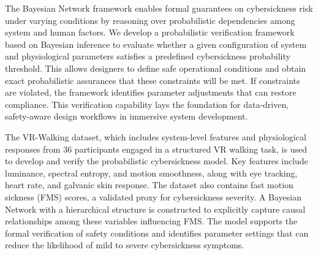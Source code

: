 \documentclass{vgtc}                          %
\begin{document}
The Bayesian Network framework enables formal guarantees on cybersickness risk under varying conditions by reasoning over probabilistic dependencies among system and human factors. We develop a probabilistic verification framework based on Bayesian inference to evaluate whether a given configuration of system and physiological parameters satisfies a predefined cybersickness probability threshold. This allows designers to define safe operational conditions and obtain exact probabilistic assurances that these constraints will be met. If constraints are violated, the framework identifies parameter adjustments that can restore compliance. This verification capability lays the foundation for data-driven, safety-aware design workflows in immersive system development.




The VR-Walking dataset\cite{setu2024mazedconfuseddatasetcybersickness}, which includes system-level features and physiological responses from 36 participants engaged in a structured VR walking task, is used to develop and verify the probabilistic cybersickness model. Key features include luminance, spectral entropy, and motion smoothness, along with eye tracking, heart rate, and galvanic skin response. The dataset also contains fast motion sickness (FMS) scores\cite{keshavarz2011validating}, a validated proxy for cybersickness severity. A Bayesian Network with a hierarchical structure is constructed to explicitly capture causal relationships among these variables influencing FMS. The model supports the formal verification of safety conditions and identifies parameter settings that can reduce the likelihood of mild to severe cybersickness symptoms.
\end{document}
